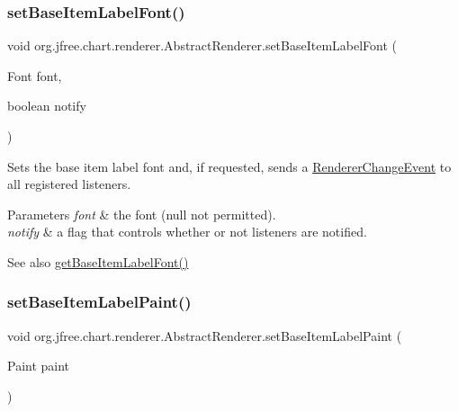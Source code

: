 \subsubsection{\texorpdfstring{set\+Base\+Item\+Label\+Font()}{setBaseItemLabelFont()}\hspace{0.1cm}{\footnotesize\ttfamily [2/2]}}
{\footnotesize\ttfamily void org.\+jfree.\+chart.\+renderer.\+Abstract\+Renderer.\+set\+Base\+Item\+Label\+Font (\begin{DoxyParamCaption}\item[{Font}]{font,  }\item[{boolean}]{notify }\end{DoxyParamCaption})}

Sets the base item label font and, if requested, sends a \mbox{\hyperlink{}{Renderer\+Change\+Event}} to all registered listeners.


\begin{DoxyParams}{Parameters}
{\em font} & the font ({\ttfamily null} not permitted). \\
\hline
{\em notify} & a flag that controls whether or not listeners are notified.\\
\hline
\end{DoxyParams}
\begin{DoxySeeAlso}{See also}
\mbox{\hyperlink{classorg_1_1jfree_1_1chart_1_1renderer_1_1_abstract_renderer_aa6277326bc1ddd480515de060803b682}{get\+Base\+Item\+Label\+Font()}} 
\end{DoxySeeAlso}
\mbox{\label{classorg_1_1jfree_1_1chart_1_1renderer_1_1_abstract_renderer_a7f9efd901126d27a6f785a53e6872e04}} 
\subsubsection{\texorpdfstring{set\+Base\+Item\+Label\+Paint()}{setBaseItemLabelPaint()}\hspace{0.1cm}{\footnotesize\ttfamily [1/2]}}
{\footnotesize\ttfamily void org.\+jfree.\+chart.\+renderer.\+Abstract\+Renderer.\+set\+Base\+Item\+Label\+Paint (\begin{DoxyParamCaption}\item[{Paint}]{paint }\end{DoxyParamCaption})}

